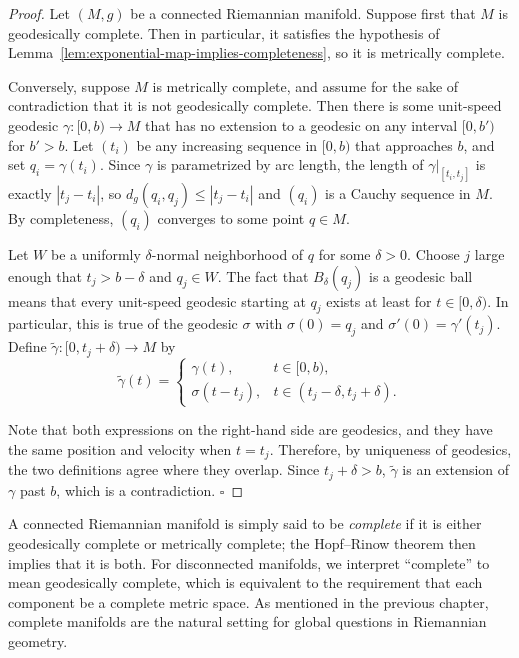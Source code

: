 \begin{proof}
Let $(M, g)$ be a connected Riemannian manifold. Suppose first that $M$ is geodesically complete. Then in particular, it satisfies the hypothesis of Lemma~\ref{lem:exponential-map-implies-completeness}, so it is metrically complete.

Conversely, suppose $M$ is metrically complete, and assume for the sake of contradiction that it is not geodesically complete. Then there is some unit-speed geodesic $\gamma : [0, b) \to M$ that has no extension to a geodesic on any interval $[0, b')$ for $b' > b$. Let $(t_i)$ be any increasing sequence in $[0, b)$ that approaches $b$, and set $q_i = \gamma(t_i)$. Since $\gamma$ is parametrized by arc length, the length of $\gamma|_{[t_i,t_j]}$ is exactly $|t_j - t_i|$, so $d_g(q_i, q_j) \leq |t_j - t_i|$ and $(q_i)$ is a Cauchy sequence in $M$. By completeness, $(q_i)$ converges to some point $q \in M$.


Let $W$ be a uniformly $\delta$-normal neighborhood of $q$ for some $\delta > 0$. Choose $j$ large enough that $t_j > b - \delta$ and $q_j \in W$. The fact that $B_\delta(q_j)$ is a geodesic ball means that every unit-speed geodesic starting at $q_j$ exists at least for $t \in [0, \delta)$. In particular, this is true of the geodesic $\sigma$ with $\sigma(0) = q_j$ and $\sigma'(0) = \gamma'(t_j)$. Define $\tilde{\gamma} : [0, t_j + \delta) \to M$ by
\[
\tilde{\gamma}(t) = \begin{cases} \gamma(t), & t \in [0, b), \\ \sigma(t - t_j), & t \in (t_j - \delta, t_j + \delta). \end{cases}
\]

Note that both expressions on the right-hand side are geodesics, and they have the same position and velocity when $t = t_j$. Therefore, by uniqueness of geodesics, the two definitions agree where they overlap. Since $t_j + \delta > b$, $\tilde{\gamma}$ is an extension of $\gamma$ past $b$, which is a contradiction. $\square$
\end{proof}

A connected Riemannian manifold is simply said to be \emph{complete} if it is either geodesically complete or metrically complete; the Hopf--Rinow theorem then implies that it is both. For disconnected manifolds, we interpret ``complete'' to mean geodesically complete, which is equivalent to the requirement that each component be a complete metric space. As mentioned in the previous chapter, complete manifolds are the natural setting for global questions in Riemannian geometry.

